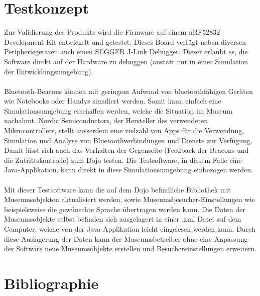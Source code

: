 \documentclass[10pt,a4paper,oneside]{99_fhnwreport}
\begin{document}
\section{Testkonzept}\label{sec:testkonzept}
Zur Validierung des Produkts wird die Firmware auf einem nRF52832 Development Kit entwickelt und getestet. Dieses Board verfügt neben diversen Peripheriegeräten auch einen SEGGER J-Link Debugger. Dieser erlaubt es, die Software direkt auf der Hardware zu debuggen (anstatt nur in einer Simulation der Entwicklungsumgebung).\\
\\
Bluetooth-Beacons können mit geringem Aufwand von bluetoothfähigen Geräten wie Notebooks oder Handys simuliert werden. Somit kann einfach eine Simulationsumgebung erschaffen werden, welche die Situation im Museum nachahmt. Nordic Semiconductors, der Hersteller des verwendeten Mikrocontrollers, stellt ausserdem eine vielzahl von Apps für die Verwendung, Simulation und Analyse von Bluetoothverbindungen und Dienste zur Verfügung. Damit lässt sich auch das Verhalten der Gegenseite (Feedback der Beacons und die Zutrittskontrolle) zum Dojo testen. Die Testsoftware, in diesem Falle eine Java-Applikation, kann direkt in diese Simulationsumgebung einbezogen werden.\\
\\
Mit dieser Testsoftware kann die auf dem Dojo befindliche Bibliothek mit Museumsobjekten aktualisiert werden, sowie Museumsbesucher-Einstellungen wie beispielsweise die gewünschte Sprache übertragen werden kann. Die Daten der Museumsobjekte selbst befinden sich ausgelagert in einer .xml Datei auf dem Computer, welche von der Java-Applikation leicht eingelesen werden kann. Durch diese Auslagerung der Daten kann der Museumsbetreiber ohne eine Anpassung der Software neue Museumsobjekte erstellen und Besuchereinstellungen erweitern.

\section{Bibliographie}\label{sec:bibliographie}

\clearpage
\end{document}
